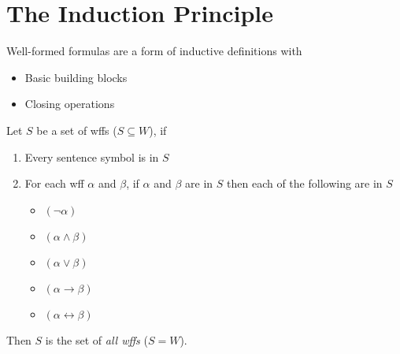 \section{The Induction Principle}
\label{sec:Induction}

Well-formed formulas are a form of inductive definitions with
\begin{itemize}
    \item Basic building blocks
    \item Closing operations
\end{itemize}

\begin{theorem}
    \label{thm:InductionPrinciple}
    Let $S$ be a set of wffs ($S \subseteq W$), if
    \begin{enumerate}
        \item Every sentence symbol is in $S$
        \item For each wff $\alpha$ and $\beta$, if $\alpha$ and $\beta$ are in $S$ then each of the following are in $S$
        \begin{itemize}
            \item $(\neg \alpha)$
            \item $(\alpha \wedge \beta)$
            \item $(\alpha \vee \beta)$
            \item $(\alpha \rightarrow \beta)$
            \item $(\alpha \leftrightarrow \beta)$
        \end{itemize}
    \end{enumerate}
    Then $S$ is the set of \emph{all wffs} ($S = W$).
\end{theorem}
